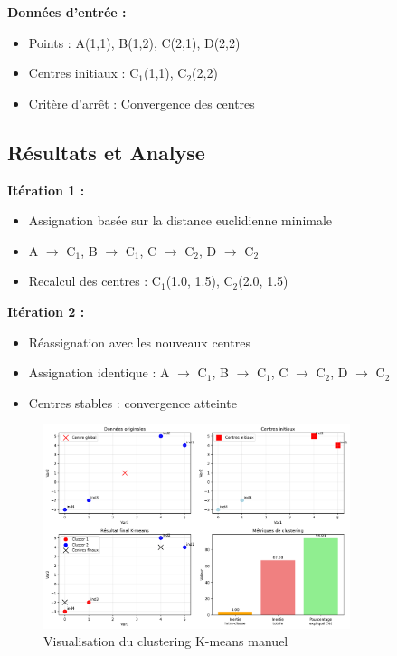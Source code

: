 \documentclass[12pt,a4paper]{article}
\begin{document}
\textbf{Données d'entrée :}
\begin{itemize}
    \item Points : A(1,1), B(1,2), C(2,1), D(2,2)
    \item Centres initiaux : C$_1$(1,1), C$_2$(2,2)
    \item Critère d'arrêt : Convergence des centres
\end{itemize}

\subsection{Résultats et Analyse}

\textbf{Itération 1 :}
\begin{itemize}
    \item Assignation basée sur la distance euclidienne minimale
    \item A $\rightarrow$ C$_1$, B $\rightarrow$ C$_1$, C $\rightarrow$ C$_2$, D $\rightarrow$ C$_2$
    \item Recalcul des centres : C$_1$(1.0, 1.5), C$_2$(2.0, 1.5)
\end{itemize}

\textbf{Itération 2 :}
\begin{itemize}
    \item Réassignation avec les nouveaux centres
    \item Assignation identique : A $\rightarrow$ C$_1$, B $\rightarrow$ C$_1$, C $\rightarrow$ C$_2$, D $\rightarrow$ C$_2$
    \item Centres stables : convergence atteinte
\end{itemize}

\begin{figure}[H]
    \centering
    \includegraphics[width=0.8\textwidth]{exercice1_kmeans_manuel.png}
    \caption{Visualisation du clustering K-means manuel}
    \label{fig:kmeans_manuel}
\end{figure}
\end{document}
